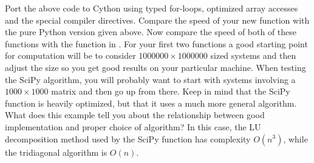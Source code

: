 \begin{problem}
Port the above code to Cython using typed for-loops, optimized array accesses and the special compiler directives.
Compare the speed of your new function with the pure Python version given above.
Now compare the speed of both of these functions with the  function in .
For your first two functions a good starting point for computation will be to consider $1000000 \times 1000000$ sized systems and then adjust the size so you get good results on your particular machine.
When testing the SciPy algorithm, you will probably want to start with systems involving a $1000 \times 1000$ matrix and then go up from there.
Keep in mind that the SciPy function is heavily optimized, but that it uses a much more general algorithm.
What does this example tell you about the relationship between good implementation and proper choice of algorithm?
In this case, the LU decomposition method used by the SciPy function has complexity $O(n^3)$, while the tridiagonal algorithm is $O(n)$.
\end{problem}

